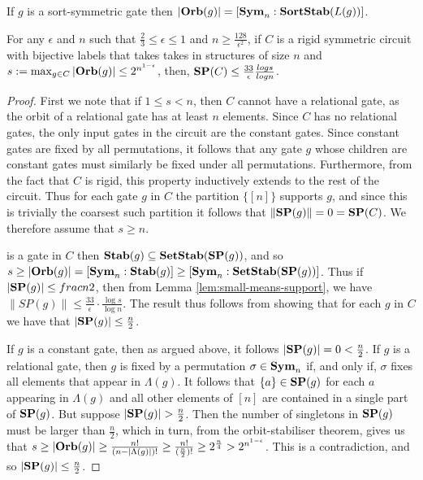 \documentclass[../paper.tex]{subfiles}
\begin{document}
If $g$ is a sort-symmetric gate then $\vert \text{\textbf{Orb}}(g) \vert = [\text{\textbf{Sym}}_n:\text{\textbf{SortStab}}
(L(g))]$.



\begin{thm}
  \label{thm:support_thm}
  For any $\epsilon$ and $n$ such that $\frac{2}{3} \leq \epsilon \leq 1$ and $n
  \geq \frac{128}{\epsilon^2}$, if $C$ is a rigid symmetric circuit with
  bijective labels that takes takes in structures of size $n$ and $s := \max_{g
    \in C} \vert \text{\textbf{Orb}} (g)\vert \leq 2^{n^{1-\epsilon}}$, then, $\text{\textbf{SP}}(C) \leq
  \frac{33}{\epsilon}\frac{log s}{log n}$.
\end{thm}

\begin{proof}
  First we note that if $1 \leq s < n$, then $C$ cannot have a relational gate,
  as the orbit of a relational gate has at least $n$ elements. Since $C$ has no
  relational gates, the only input gates in the circuit are the constant gates.
  Since constant gates are fixed by all permutations, it follows that any gate
  $g$ whose children are constant gates must similarly be fixed under all
  permutations. Furthermore, from the fact that $C$ is rigid, this property
  inductively extends to the rest of the circuit. Thus for each gate $g$ in $C$
  the partition $\{[n]\}$ supports $g$, and since this is trivially the coarsest
  such partition it follows that $\| \text{\textbf{SP}}(g) \| = 0 = \text{\textbf{SP}}(C)$. We therefore
  assume that $s \geq n$.

  is a gate in $C$ then $\text{\textbf{Stab}} (g) \subseteq \text{\textbf{SetStab}}(\text{\textbf{SP}}(g))$, and so $s \geq
  \vert \text{\textbf{Orb}}(g) \vert = [\text{\textbf{Sym}}_n : \text{\textbf{Stab}}(g)] \geq [\text{\textbf{Sym}}_n : \text{\textbf{SetStab}}(\text{\textbf{SP}}(g))]$.
  Thus if $\vert \text{\textbf{SP}}(g) \vert \leq frac{n}{2}$, then from Lemma
  \ref{lem:small-means-support}, we have $\| SP (g) \| \leq \frac{33}{\epsilon}
  \cdot \frac{\log s} {\log n}$. The result thus follows from showing that for
  each $g$ in $C$ we have that $\vert \text{\textbf{SP}} (g) \vert \leq \frac{n}{2}$.
  
  If $g$ is a constant gate, then as argued above, it follows $\vert \text{\textbf{SP}}(g)
  \vert = 0 < \frac{n}{2}$. If $g$ is a relational gate, then $g$ is fixed by a
  permutation $\sigma \in \text{\textbf{Sym}}_n$ if, and only if, $\sigma$ fixes all elements
  that appear in $\Lambda(g)$. It follows that $\{a\} \in \text{\textbf{SP}}(g)$ for each $a$
  appearing in $\Lambda(g)$ and all other elements of $[n]$ are contained in a
  single part of $\text{\textbf{SP}}(g)$. But suppose $\vert \text{\textbf{SP}}(g) \vert > \frac{n}{2}$. Then
  the number of singletons in $\text{\textbf{SP}}(g)$ must be larger than $\frac{n}{2}$, which
  in turn, from the orbit-stabiliser theorem, gives us that $ s \geq \vert \text{\textbf{Orb}}
  (g) \vert \geq \frac{n!}{(n-\vert \Lambda (g) \vert)!} \geq
  \frac{n!}{{(\frac{n}{2}})!} \geq 2^{\frac{n}{4}} > 2^{n^{1- \epsilon}} $. This
  is a contradiction, and so $\vert \text{\textbf{SP}}(g) \vert \leq \frac{n}{2}$.


\end{proof}
\end{document}
